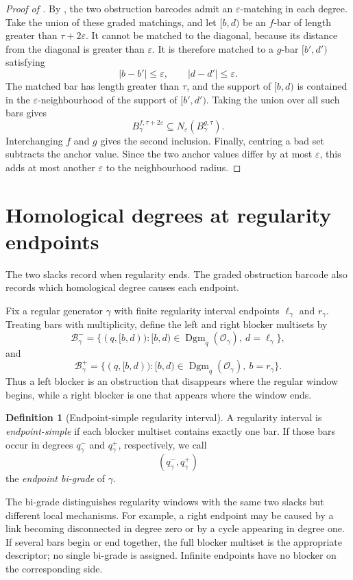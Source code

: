 \documentclass[11pt,letterpaper]{article}
\theoremstyle{definition}
\newtheorem{definition}[theorem]{Definition}
\newcommand{\Dgm}{\operatorname{Dgm}}
\newcommand{\Oc}{\mathcal O}
\newcommand{\Bc}{\mathcal B}
\newcommand{\eps}{\varepsilon}
\begin{document}
\begin{proof}[Proof of ]
By , the two obstruction barcodes
admit an $\eps$-matching in each degree. Take the union of these graded
matchings, and let $[b,d)$ be an $f$-bar of length greater than
$\tau+2\eps$. It cannot be matched to the diagonal, because its distance from
the diagonal is greater than $\eps$. It is therefore matched to a $g$-bar
$[b',d')$ satisfying
$$
|b-b'|\leq\eps,
\qquad
|d-d'|\leq\eps.
$$
The matched bar has length greater than $\tau$, and the support of $[b,d)$ is
contained in the $\eps$-neighbourhood of the support of $[b',d')$. Taking the
union over all such bars gives
$$
B_\gamma^{f,\tau+2\eps}
\subseteq N_\eps(B_\gamma^{g,\tau}).
$$
Interchanging $f$ and $g$ gives the second inclusion. Finally, centring a bad
set subtracts the anchor value. Since the two anchor values differ by at most
$\eps$, this adds at most another $\eps$ to the neighbourhood radius.
\end{proof}

\section{Homological degrees at regularity endpoints}
\label{app:endpoint-bigrading}

The two slacks record when regularity ends. The graded obstruction barcode also
records which homological degree causes each endpoint.

Fix a regular generator $\gamma$ with finite regularity interval endpoints
$\ell_\gamma$ and $r_\gamma$. Treating bars with multiplicity, define the
left and right blocker multisets by
$$
\Bc_\gamma^-
=\{(q,[b,d)):[b,d)\in\Dgm_q(\Oc_\gamma),\ d=\ell_\gamma\},
$$
and
$$
\Bc_\gamma^+
=\{(q,[b,d)):[b,d)\in\Dgm_q(\Oc_\gamma),\ b=r_\gamma\}.
$$
Thus a left blocker is an obstruction that disappears where the regular window
begins, while a right blocker is one that appears where the window ends.

\begin{definition}[Endpoint-simple regularity interval]
A regularity interval is \emph{endpoint-simple} if each blocker multiset
contains exactly one bar. If those bars occur in degrees $q_\gamma^-$ and
$q_\gamma^+$, respectively, we call
$$
(q_\gamma^-,q_\gamma^+)
$$
the \emph{endpoint bi-grade} of $\gamma$.
\end{definition}

The bi-grade distinguishes regularity windows with the same two slacks but
different local mechanisms. For example, a right endpoint may be caused by a
link becoming disconnected in degree zero or by a cycle appearing in degree
one. If several bars begin or end together, the full blocker multiset is the
appropriate descriptor; no single bi-grade is assigned. Infinite endpoints
have no blocker on the corresponding side.
\end{document}

